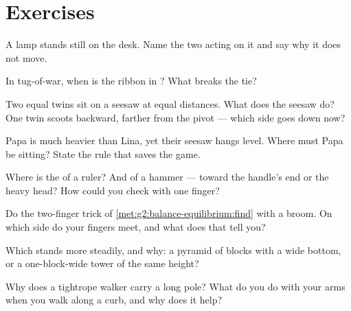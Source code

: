 \section{Exercises}

\begin{exercise}[$\star$]\label{exo:g2:balance-equilibrium:1}
A lamp stands still on the desk. Name the two  acting on it
and say why it does not move.
\end{exercise}

\begin{exercise}[$\star$]\label{exo:g2:balance-equilibrium:2}
In tug-of-war, when is the ribbon in ? What breaks the
tie?
\end{exercise}

\begin{exercise}[$\star$]\label{exo:g2:balance-equilibrium:3}
Two equal twins sit on a seesaw at equal distances. What does the
seesaw do? One twin scoots backward, farther from the pivot ---
which side goes down now?
\end{exercise}

\begin{exercise}[$\star$]\label{exo:g2:balance-equilibrium:4}
Papa is much heavier than Lina, yet their seesaw hangs level. Where
must Papa be sitting? State the rule that saves the game.
\end{exercise}

\begin{exercise}[$\star$]\label{exo:g2:balance-equilibrium:5}
Where is the  of a ruler? And of a hammer --- toward
the handle's end or the heavy head? How could you check with one
finger?
\end{exercise}

\begin{exercise}[$\star$]\label{exo:g2:balance-equilibrium:6}
Do the two-finger trick of \cref{met:g2:balance-equilibrium:find}
with a broom. On which side do your fingers meet, and what does
that tell you?
\end{exercise}

\begin{exercise}[$\star$]\label{exo:g2:balance-equilibrium:7}
Which stands more steadily, and why: a pyramid of blocks with a wide
bottom, or a one-block-wide tower of the same height?
\end{exercise}

\begin{exercise}[$\star$]\label{exo:g2:balance-equilibrium:8}
Why does a tightrope walker carry a long pole? What do you do with
your arms when you walk along a curb, and why does it help?
\end{exercise}

